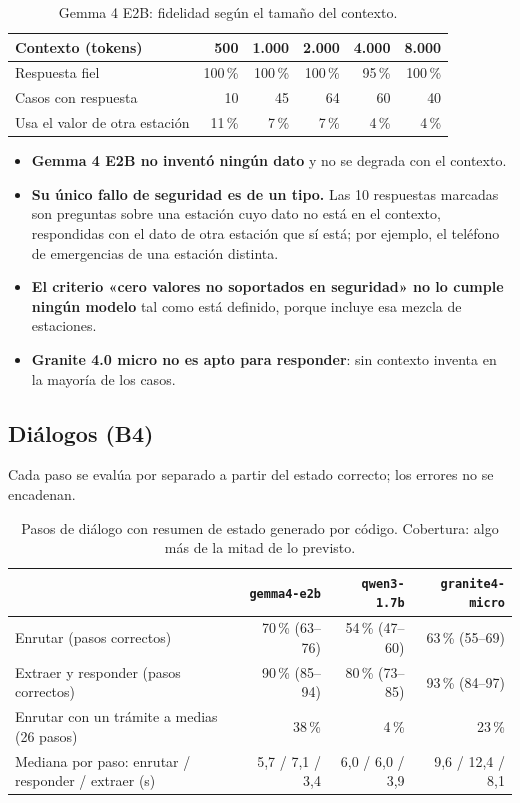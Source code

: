 \documentclass[11pt,a4paper]{article}
\newcommand{\m}[1]{\texttt{#1}}
\begin{document}
\begin{table}[H]
\centering\small
\caption{Gemma 4 E2B: fidelidad según el tamaño del contexto.}\label{tab:ctx}
\begin{tabularx}{\textwidth}{@{}p{}RRRRR@{}}
\toprule
Contexto (tokens) & 500 & 1.000 & 2.000 & 4.000 & 8.000\\
\midrule
Respuesta fiel & 100\,\% & 100\,\% & 100\,\% & 95\,\% & 100\,\%\\
Casos con respuesta & 10 & 45 & 64 & 60 & 40\\
Usa el valor de otra estación & 11\,\% & 7\,\% & 7\,\% & 4\,\% & 4\,\%\\
\bottomrule
\end{tabularx}
\end{table}

\begin{itemize}
\item \textbf{Gemma 4 E2B no inventó ningún dato} y no se degrada con el contexto.
\item \textbf{Su único fallo de seguridad es de un tipo.} Las 10 respuestas marcadas son preguntas sobre una estación cuyo dato no está en el contexto, respondidas con el dato de otra estación que sí está; por ejemplo, el teléfono de emergencias de una estación distinta.
\item \textbf{El criterio «cero valores no soportados en seguridad» no lo cumple ningún modelo} tal como está definido, porque incluye esa mezcla de estaciones.
\item \textbf{Granite 4.0 micro no es apto para responder}: sin contexto inventa en la mayoría de los casos.
\end{itemize}

\subsection{Diálogos (B4)}

Cada paso se evalúa por separado a partir del estado correcto; los errores no se encadenan.

\begin{table}[H]
\centering\small
\caption{Pasos de diálogo con resumen de estado generado por código. Cobertura: algo más de la mitad de lo previsto.}\label{tab:dialogue}
\begin{tabularx}{\textwidth}{@{}p{}RRR@{}}
\toprule
 & \m{gemma4-e2b} & \m{qwen3-1.7b} & \m{granite4-micro}\\
\midrule
Enrutar (pasos correctos) & 70\,\% (63--76) & 54\,\% (47--60) & 63\,\% (55--69)\\
Extraer y responder (pasos correctos) & 90\,\% (85--94) & 80\,\% (73--85) & 93\,\% (84--97)\\
Enrutar con un trámite a medias (26 pasos) & 38\,\% & 4\,\% & 23\,\%\\
Mediana por paso: enrutar / responder / extraer (s) & 5,7 / 7,1 / 3,4 & 6,0 / 6,0 / 3,9 & 9,6 / 12,4 / 8,1\\
\bottomrule
\end{tabularx}
\end{table}
\end{document}
